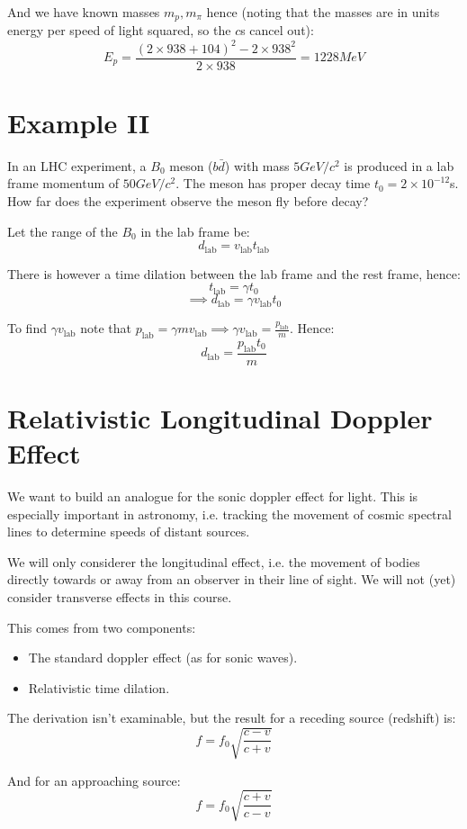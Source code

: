 And we have known masses $m_p, m_\pi$ hence (noting that the masses are in units energy per speed of light squared, so the $c$s cancel out):
\[
    E_p = \frac{\left(2 \times 938 + 104\right)^2-2\times 938^2}{2 \times 938} = 1228 \si{MeV}
\]

\section{Example II}
In an LHC experiment, a $B_0$ meson ($b \bar{d}$) with mass $5 \si{GeV / c^2}$ is produced in a lab frame momentum of $50 \si{GeV / c^2}$. The meson has proper decay time $t_0 = 2 \times 10^{-12}$s. How far does the experiment observe the meson fly before decay?

Let the range of the $B_0$ in the lab frame be:
\[
    d_\text{lab} = v_\text{lab} t_\text{lab}
\]

There is however a time dilation between the lab frame and the rest frame, hence:
\[
    t_\text{lab} = \gamma t_0
\]
\[
    \implies d_\text{lab} = \gamma v_\text{lab} t_0
\]

To find $\gamma v_\text{lab}$ note that $p_\text{lab} = \gamma m v_\text{lab} \implies \gamma v_\text{lab} = \frac{p_\text{lab}}{m}$. Hence:
\[
    d_\text{lab} = \frac{p_\text{lab} t_0}{m}
\]


\section{Relativistic Longitudinal Doppler Effect}
We want to build an analogue for the sonic doppler effect for light. This is especially important in astronomy, i.e. tracking the movement of cosmic spectral lines to determine speeds of distant sources.

We will only considerer the longitudinal effect, i.e. the movement of bodies directly towards or away from an observer in their line of sight. We will not (yet) consider transverse effects in this course.

This comes from two components:
\begin{itemize}
    \item The standard doppler effect (as for sonic waves).
    \item Relativistic time dilation.
\end{itemize}

The derivation isn't examinable, but the result for a receding source (redshift) is:
\[
    f = f_0 \sqrt{\frac{c - v}{c + v}}
\]

And for an approaching source:
\[
    f = f_0 \sqrt{\frac{c + v}{c -v}}
\]

